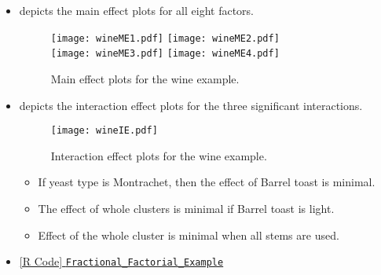 \begin{itemize}
\begin{itemize}[*]
          \end{itemize}
    \item {} depicts the main effect plots for all eight factors.
          \begin{figure}[!htbp]
              \centering
              \texttt{[image: wineME1.pdf]}\hfill
              \texttt{[image: wineME2.pdf]}
              \\[\smallskipamount]
              \texttt{[image: wineME3.pdf]}\hfill
              \texttt{[image: wineME4.pdf]}
              \caption{Main effect plots for the wine example.}\label{fig:wineME}
          \end{figure}
    \item {} depicts the interaction effect plots for the three significant interactions.
          \begin{figure}[!htbp]
              \centering
              \texttt{[image: wineIE.pdf]}
              \caption{Interaction effect plots for the wine example.}\label{fig:wineIE}
          \end{figure}
          \begin{itemize}
              \item If yeast type is Montrachet, then the effect of Barrel toast is minimal.
              \item The effect of whole clusters is minimal if Barrel toast is light.
              \item Effect of the whole cluster is minimal when all stems are used.
          \end{itemize}
    \item \href{https://github.com/Hextical/university-notes/blob/master/year-3/semester-3/STAT 430/code/W11/Fractional_Factorial_Example.R}{[R Code] \texttt{Fractional\_Factorial\_Example}}
\end{itemize}
